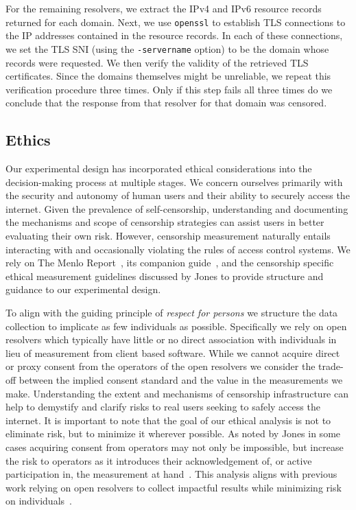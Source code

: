 For the remaining resolvers, we extract the IPv4 and IPv6 resource records
returned for each domain. Next, we use {\tt openssl} to establish TLS
connections to the IP addresses contained in the resource records. In each of
these connections, we set the TLS SNI (using the {\tt -servername} option) to
be the domain whose records were requested. We then verify the validity of the
retrieved TLS certificates.
%
Since the domains themselves might be unreliable, we repeat this verification
procedure three times. Only if this step fails all three times do we conclude
that the response from that resolver for that domain was censored. 

\subsection{Ethics}\label{sec:methodology:ethics}
Our experimental design has incorporated ethical considerations into the
decision-making process at multiple stages. We concern ourselves primarily with
the security and autonomy of human users and their ability to securely access
the internet. Given the prevalence of self-censorship, understanding and
documenting the mechanisms and scope of censorship strategies can assist users
in better evaluating their own risk. However, censorship measurement naturally
entails interacting with and occasionally violating the rules of access control
systems. We rely on The Menlo Report~\cite{menlo}, its companion
guide~\cite{menlo-companion}, and the censorship specific ethical measurement
guidelines discussed by Jones \etal \cite{jones2015ethical} to provide
structure and guidance to our experimental design.

To align with the guiding principle of \textit{respect for persons} we
structure the data collection to implicate as few individuals as possible.
Specifically we rely on open resolvers which typically have little or no direct
association with individuals in lieu of measurement from client based
software. While we cannot acquire direct or proxy consent from the operators of
the open resolvers we consider the trade-off between the implied consent
standard and the value in the measurements we make. Understanding the extent
and mechanisms of censorship infrastructure can help to demystify and clarify
risks to real users seeking to safely access the internet. It is important to
note that the goal of our ethical analysis is not to eliminate risk, but to
minimize it wherever possible. As noted by Jones \etal in some cases acquiring
consent from operators may not only be impossible, but increase the risk to
operators as it introduces their acknowledgement of, or active participation
in, the measurement at hand~\cite{jones2015ethical}. This analysis aligns with
previous work relying on open resolvers to collect impactful results while
minimizing risk on
individuals~\cite{pearce2017global,scott2016satellite,sundara2020censored}.

